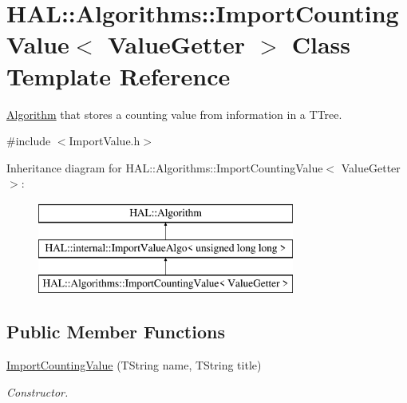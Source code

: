 \hypertarget{class_h_a_l_1_1_algorithms_1_1_import_counting_value}{\section{H\+A\+L\+:\+:Algorithms\+:\+:Import\+Counting\+Value$<$ Value\+Getter $>$ Class Template Reference}
\label{class_h_a_l_1_1_algorithms_1_1_import_counting_value}
}


\hyperlink{class_h_a_l_1_1_algorithm}{Algorithm} that stores a counting value from information in a T\+Tree.  




{\ttfamily \#include $<$Import\+Value.\+h$>$}

Inheritance diagram for H\+A\+L\+:\+:Algorithms\+:\+:Import\+Counting\+Value$<$ Value\+Getter $>$\+:\begin{figure}[H]
\begin{center}
\leavevmode
\includegraphics[height=3.000000cm]{class_h_a_l_1_1_algorithms_1_1_import_counting_value}
\end{center}
\end{figure}
\subsection*{Public Member Functions}
\begin{DoxyCompactItemize}
\item 
\hyperlink{class_h_a_l_1_1_algorithms_1_1_import_counting_value_a9abeea49a97ffe789dc1e70a2436b027}{Import\+Counting\+Value} (T\+String name, T\+String title)
\begin{DoxyCompactList}\small\item\em Constructor. \end{DoxyCompactList}\end{DoxyCompactItemize}
